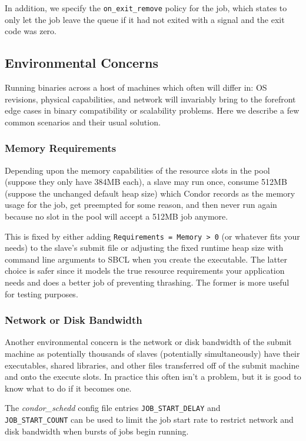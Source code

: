 \documentclass[titlepage,12pt]{book}
\newcommand{\sbcl}{SBCL\xspace}
\begin{document}
In addition, we specify the \texttt{on\_exit\_remove} policy for the
job, which states to only let the job leave the queue if it had not
exited with a signal and the exit code was zero.

\subsection{Environmental Concerns}

Running binaries across a host of machines which often will differ in:
OS revisions, physical capabilities, and network will invariably bring
to the forefront edge cases in binary compatibility or scalability
problems. Here we describe a few common scenarios and their usual
solution.

\subsubsection{Memory Requirements}

Depending upon the memory capabilities of the resource slots in
the pool (suppose they only have 384MB each), a slave may run once,
consume 512MB (suppose the unchanged default heap size) which Condor
records as the memory usage for the job, get preempted for some reason,
and then never run again because no slot in the pool will accept a
512MB job anymore.

This is fixed by either adding \texttt{Requirements = Memory > 0}
(or whatever fits your needs) to the slave's submit file or adjusting
the fixed runtime heap size with command line arguments to \sbcl
when you create the executable. The latter choice is safer since it
models the true resource requirements your application needs and does
a better job of preventing thrashing. The former is more useful for
testing purposes.

\subsubsection{Network or Disk Bandwidth}

Another environmental concern is the network or disk bandwidth of
the submit machine as potentially thousands of slaves (potentially
simultaneously) have their executables, shared libraries, and other
files transferred off of the submit machine and onto the execute slots.
In practice this often isn't a problem, but it is good to know what
to do if it becomes one.

The \textit{condor\_schedd} config file entries
\texttt{JOB\_START\_DELAY} and\\ \texttt{JOB\_START\_COUNT} can be used
to limit the job start rate to restrict network and disk bandwidth
when bursts of jobs begin running.
\end{document}
